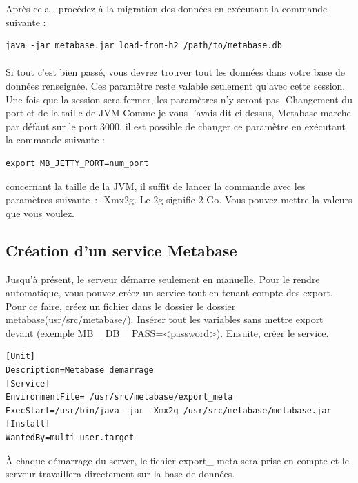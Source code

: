 \documentclass[a4paper,12pt]{report}
\begin{document}
Après cela , procédez à la migration des données en exécutant la commande suivante : 
\lstset{
language=SQL,
basicstyle=\footnotesize,
}
\begin{lstlisting}
java -jar metabase.jar load-from-h2 /path/to/metabase.db
\end{lstlisting}
\paragraph*{}
Si tout c’est bien passé, vous devrez trouver tout les données dans votre base de données renseignée. Ces paramètre reste valable seulement qu’avec cette session. Une fois que la session sera fermer, les paramètres n’y seront pas. 
 Changement du port et de la taille de JVM
Comme je vous l’avais dit ci-dessus, Metabase marche par défaut sur le port 3000. il est possible de changer ce paramètre en exécutant la commande suivante : \newline
\lstset{
language=SQL,
basicstyle=\footnotesize,
}
\begin{lstlisting}
export MB_JETTY_PORT=num_port
\end{lstlisting}

concernant la taille de la JVM, il suffit de lancer la commande avec les paramètres suivante :
 -Xmx2g. 
Le 2g signifie 2 Go. Vous pouvez mettre la valeurs que vous voulez.    

\subsection{Création d’un service Metabase} 

Jusqu’à présent, le serveur démarre seulement en manuelle. Pour le rendre automatique, vous pouvez créez un service tout en tenant compte des export. Pour ce faire, créez un fichier dans le dossier le dossier metabase(usr/src/metabase/). Insérer tout les variables sans mettre export devant (exemple MB\_\ DB\_\ PASS=<password>). Ensuite, créer le service.

\lstset{
language=SQL,
basicstyle=\footnotesize,
}
\begin{lstlisting}
[Unit]
Description=Metabase demarrage
[Service]
EnvironmentFile= /usr/src/metabase/export_meta
ExecStart=/usr/bin/java -jar -Xmx2g /usr/src/metabase/metabase.jar 
[Install]
WantedBy=multi-user.target

\end{lstlisting} 
À chaque démarrage du server, le fichier export\_ meta sera prise en compte et le serveur travaillera directement sur la base de données.
\end{document}
